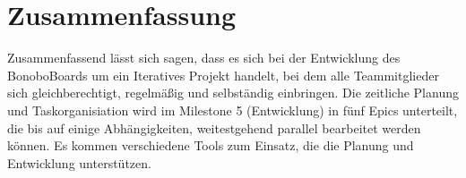 \documentclass[a4paper,11pt]{scrartcl}
\begin{document}
\section{Zusammenfassung}\label{sec:zusammenfassung}
Zusammenfassend lässt sich sagen, dass es sich bei der Entwicklung des BonoboBoards um ein Iteratives Projekt handelt, bei dem alle Teammitglieder sich gleichberechtigt, regelmäßig und selbständig einbringen. Die zeitliche Planung und Taskorganisiation wird im Milestone 5 (Entwicklung) in fünf Epics unterteilt, die bis auf einige Abhängigkeiten, weitestgehend parallel bearbeitet werden können.  Es kommen verschiedene Tools zum Einsatz, die die Planung und Entwicklung unterstützen.
\end{document}
